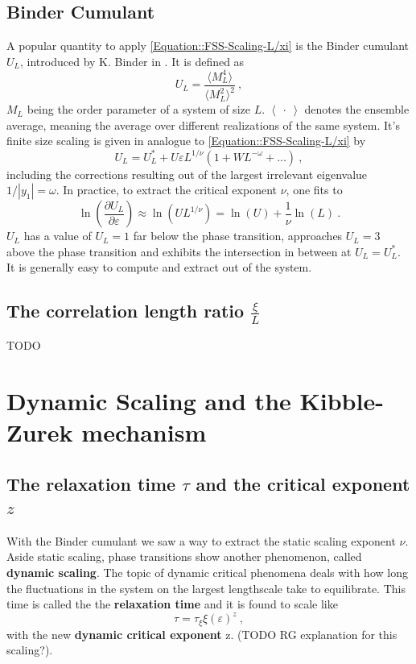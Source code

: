 	\subsection{Binder Cumulant} \label{Sec::Binder-Cumulant}
	A popular quantity to apply \autoref{Equation::FSS-Scaling-L/xi} is the Binder cumulant $U_L$, introduced by K. Binder in \cite{binder1981finite}. It is defined as
	\begin{equation} \label{Eq::Def-Binder-Cum}
		U_L =	\frac{\langle M_L^4 \rangle}{\langle M_L^2 \rangle^2}~,
	\end{equation}
	$M_L$ being the order parameter of a system of size $L$. $\left\langle~\cdot~\right \rangle$ denotes the ensemble average, meaning the average over different realizations of the same system. It's finite size scaling is given in analogue to \autoref{Equation::FSS-Scaling-L/xi} by
	\begin{equation}
		U_L =	U_L^* + U \varepsilon L^{1/\nu} \left(1 + W L^{-\omega} + ...\right)~,
	\end{equation}
	including the corrections resulting out of the largest irrelevant eigenvalue $1/|y_1| =	\omega $.
	In practice, to extract the critical exponent $\nu$, one fits to
	\begin{equation} \label{Eq::FSS-dU_dT}
		\ln \left(\frac{\partial U_L}{\partial \varepsilon}\right) \approx	\ln \left(U L^{1/\nu} \right) =	\ln (U) + \frac{1}{\nu} \ln (L) ~.
	\end{equation}
	$U_L$ has a value of $U_L = 1$ far below the phase transition, approaches $U_L =	3$ above the phase transition and exhibits the intersection in between at $U_L =	U_L^*$. It is generally easy to compute and extract out of the system.
	
	\subsection{The correlation length ratio $\frac{\xi}{L}$}
	TODO
	
	\section{Dynamic Scaling and the Kibble-Zurek mechanism} \label{Section::Dynamic-Scaling}
	\subsection{The relaxation time $\tau$ and the critical exponent $z$}
	With the Binder cumulant we saw a way to extract the static scaling exponent $\nu$. Aside static scaling, phase transitions show another phenomenon, called \textbf{dynamic scaling}. The topic of dynamic critical phenomena deals with how long the fluctuations in the system on the largest lengthscale take to equilibrate. This time is called the the \textbf{relaxation time} and it is found to scale like
	\begin{equation}
		\tau =	\tau_\xi \xi(\varepsilon)^z~,
	\end{equation}
	with the new \textbf{dynamic critical exponent} z. (TODO RG explanation for this scaling?). \\
	
